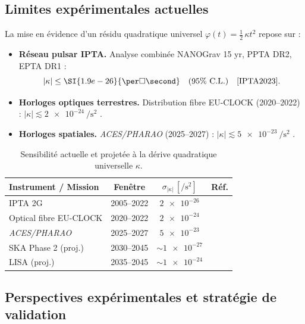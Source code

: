 \documentclass[11pt]{article}
\begin{document}
\subsection{Limites expérimentales actuelles}

La mise en évidence d’un résidu quadratique universel
\(\varphi(t)=\tfrac12\,\kappa t^{2}\) repose sur :

\begin{itemize}
  \item \textbf{Réseau pulsar IPTA.}  
        Analyse combinée NANOGrav 15 yr, PPTA DR2, EPTA DR1 :
        \[
            |\kappa|\le
            \SI{1.9e-26}{\per\square\second}
            \quad(95 \%\ \text{C.L.})
            \quad\text{\cite{IPTA2023}}.
        \]
  \item \textbf{Horloges optiques terrestres.}  
        Distribution fibre EU-CLOCK (2020–2022) :
        \(|\kappa|\lesssim\SI{2e-24}{\per\square\second}\)
        \parencite{Louchet2022}.
  \item \textbf{Horloges spatiales.}  
        \emph{ACES/PHARAO} (2025–2027) :
        \(|\kappa|\lesssim\SI{5e-23}{\per\square\second}\)
        \parencite{ACES2018}.
\end{itemize}

\begin{table}[ht]
  \centering
  \caption{Sensibilité actuelle et projetée à la dérive quadratique
           universelle \(\kappa\).}
  \label{tab:sensi_future}
  \begin{tabular}{lccc}
    \toprule
    Instrument / Mission & Fenêtre & \(\sigma_{|\kappa|}\,[\si{\per\square\second}]\) & Réf. \\
    \midrule
    IPTA 2G                            & 2005–2022 & \(\num{2e-26}\) & \textcite{IPTA2023} \\
    Optical fibre EU-CLOCK             & 2020–2022 & \(\num{2e-24}\) & \textcite{Louchet2022} \\
    \emph{ACES/PHARAO}                 & 2025–2027 & \(\num{5e-23}\) & \textcite{ACES2018} \\
    SKA Phase 2 (proj.)                & 2030–2045 & \(\sim\num{1e-27}\) & \textcite{SKA2020} \\
    LISA (proj.)                       & 2035–2045 & \(\sim\num{1e-24}\) & \textcite{LISA2023} \\
    \bottomrule
  \end{tabular}
\end{table}

\subsection{Perspectives expérimentales et stratégie de validation}
\end{document}
